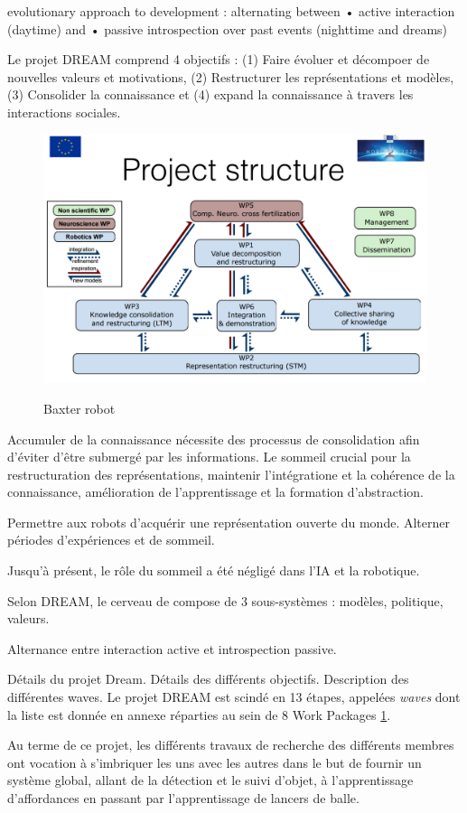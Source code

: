 \documentclass{llncs}
\begin{document}
evolutionary approach to
development : alternating between
• active interaction (daytime) and
• passive introspection over past
events (nighttime and dreams)

Le projet DREAM comprend 4 objectifs : (1) Faire évoluer et décompoer de nouvelles valeurs et motivations, (2) Restructurer les représentations et modèles, (3) Consolider la connaissance et (4) expand la connaissance à travers les interactions sociales.

\begin{figure}
	\centering
	\includegraphics[width=.5\textwidth]{figures/project_structure.png}
	\label{fig:dream}
	\caption{Baxter robot}
\end{figure}

Accumuler de la connaissance nécessite des processus de consolidation afin d'éviter d'être submergé par les informations. Le sommeil crucial pour la restructuration des représentations, maintenir l'intégratione et la cohérence de la connaissance, amélioration de l'apprentissage et la formation d'abstraction.

Permettre aux robots d'acquérir une représentation ouverte du monde. Alterner périodes d'expériences et de sommeil.

Jusqu'à présent, le rôle du sommeil a été négligé dans l'IA et la robotique.

Selon DREAM, le cerveau de compose de 3 sous-systèmes : modèles, politique, valeurs.

Alternance entre interaction active et introspection passive.

Détails du projet Dream.
Détails des différents objectifs.
Description des différentes waves.
Le projet DREAM est scindé en 13 étapes, appelées \textit{waves} dont la liste est donnée en annexe réparties au sein de 8 Work Packages \ref{fig:dream}.

Au terme de ce projet, les différents travaux de recherche des différents membres ont vocation à s'imbriquer les uns avec les autres dans le but de fournir un système global, allant de la détection et le suivi d'objet, à l'apprentissage d'affordances en passant par l'apprentissage de lancers de balle.
\end{document}

